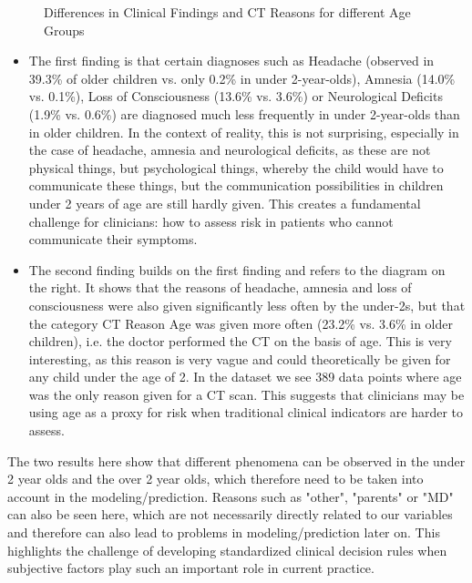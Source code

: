 \documentclass[10pt,letterpaper]{article}
\begin{document}
\begin{figure}[H]
    \centering
    \caption{Differences in Clinical Findings and CT Reasons for different Age Groups}
    \label{fig:age_category}
\end{figure}

\begin{itemize}
\item The first finding is that certain diagnoses such as Headache (observed in 39.3\% of older children vs. only 0.2\% in under 2-year-olds), Amnesia (14.0\% vs. 0.1\%), Loss of Consciousness (13.6\% vs. 3.6\%) or Neurological Deficits (1.9\% vs. 0.6\%) are diagnosed much less frequently in under 2-year-olds than in older children. In the context of reality, this is not surprising, especially in the case of headache, amnesia and neurological deficits, as these are not physical things, but psychological things, whereby the child would have to communicate these things, but the communication possibilities in children under 2 years of age are still hardly given. This creates a fundamental challenge for clinicians: how to assess risk in patients who cannot communicate their symptoms.
\item The second finding builds on the first finding and refers to the diagram on the right. It shows that the reasons of headache, amnesia and loss of consciousness were also given significantly less often by the under-2s, but that the category CT Reason Age was given more often (23.2\% vs. 3.6\% in older children), i.e. the doctor performed the CT on the basis of age. This is very interesting, as this reason is very vague and could theoretically be given for any child under the age of 2. In the dataset we see 389 data points where age was the only reason given for a CT scan. This suggests that clinicians may be using age as a proxy for risk when traditional clinical indicators are harder to assess.
\end{itemize}

The two results here show that different phenomena can be observed in the under 2 year olds and the over 2 year olds, which therefore need to be taken into account in the modeling/prediction. Reasons such as "other", "parents" or "MD" can also be seen here, which are not necessarily directly related to our variables and therefore can also lead to problems in modeling/prediction later on. This highlights the challenge of developing standardized clinical decision rules when subjective factors play such an important role in current practice.
\end{document}
